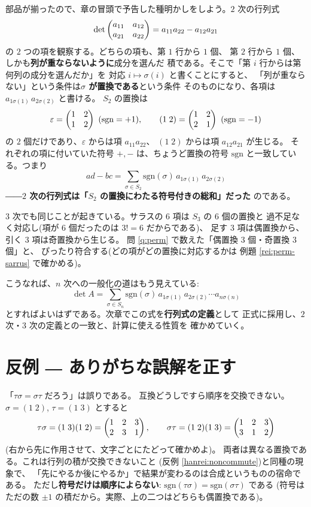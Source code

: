 部品が揃ったので、章の冒頭で予告した種明かしをしよう。$2$ 次の行列式
\[
\det \begin{pmatrix}a_{11} & a_{12} \\ a_{21} & a_{22}\end{pmatrix} = a_{11}a_{22} - a_{12}a_{21}
\]
の $2$ つの項を観察する。どちらの項も、第 $1$ 行から $1$ 個、
第 $2$ 行から $1$ 個、しかも\textbf{列が重ならないように}成分を選んだ
積である。そこで「第 $i$ 行からは第何列の成分を選んだか」を
対応 $i \mapsto \sigma(i)$ と書くことにすると、
「列が重ならない」という条件は\textbf{$\sigma$ が置換である}という条件
そのものになり、各項は $a_{1\sigma(1)}\, a_{2\sigma(2)}$ と書ける。
$S_2$ の置換は
\[
\varepsilon = \begin{pmatrix}1 & 2 \\ 1 & 2\end{pmatrix}\ (\mathrm{sgn} = +1), \qquad
(1\;2) = \begin{pmatrix}1 & 2 \\ 2 & 1\end{pmatrix}\ (\mathrm{sgn} = -1)
\]
の $2$ 個だけであり、$\varepsilon$ からは項 $a_{11}a_{22}$、
$(1\;2)$ からは項 $a_{12}a_{21}$ が生じる。
それぞれの項に付いていた符号 $+, -$ は、ちょうど置換の符号
$\mathrm{sgn}$ と一致している。つまり
\[
ad - bc = \sum_{\sigma \in S_2} \mathrm{sgn}(\sigma)\,
a_{1\sigma(1)}\, a_{2\sigma(2)}
\]
――\textbf{$2$ 次の行列式は「$S_2$ の置換にわたる符号付きの総和」だった}
のである。

$3$ 次でも同じことが起きている。サラスの $6$ 項は $S_3$ の $6$ 個の置換と
過不足なく対応し(項が $6$ 個だったのは $3! = 6$ だからである)、
足す $3$ 項は偶置換から、引く $3$ 項は奇置換から生じる。
問 \ref{q:perm} で数えた「偶置換 $3$ 個・奇置換 $3$ 個」と、
ぴったり符合する(どの項がどの置換に対応するかは
例題 \ref{rei:perm-sarrus} で確かめる)。

こうなれば、$n$ 次への一般化の道はもう見えている:
\[
\det A = \sum_{\sigma \in S_n} \mathrm{sgn}(\sigma)\,
a_{1\sigma(1)}\, a_{2\sigma(2)} \cdots a_{n\sigma(n)}
\]
とすればよいはずである。次章でこの式を\textbf{行列式の定義}として
正式に採用し、$2$ 次・$3$ 次の定義との一致と、計算に使える性質を
確かめていく。

\section{反例 ― ありがちな誤解を正す}

\begin{hanrei}[置換の合成は交換できない]\label{hanrei:perm-noncomm}
「$\tau\sigma = \sigma\tau$ だろう」は誤りである。
互換どうしですら順序を交換できない。$\sigma = (1\;2)$, $\tau = (1\;3)$
とすると
\[
\tau\sigma = (1\;3)(1\;2) = \begin{pmatrix}1 & 2 & 3 \\ 2 & 3 & 1\end{pmatrix}, \qquad
\sigma\tau = (1\;2)(1\;3) = \begin{pmatrix}1 & 2 & 3 \\ 3 & 1 & 2\end{pmatrix}
\]
(右から先に作用させて、文字ごとにたどって確かめよ)。
両者は異なる置換である。これは行列の積が交換できないこと
(反例 \ref{hanrei:noncommute})と同種の現象で、
「先にやるか後にやるか」で結果が変わるのは合成というものの宿命である。
ただし\textbf{符号だけは順序によらない}:
$\mathrm{sgn}(\tau\sigma) = \mathrm{sgn}(\sigma\tau)$ である
(符号はただの数 $\pm 1$ の積だから。実際、上の二つはどちらも偶置換である)。
\end{hanrei}

